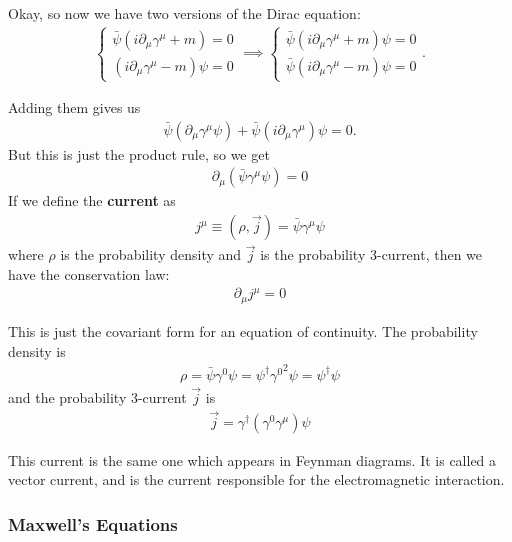 \documentclass{book}
\theoremstyle{definition}
\newcommand{\p}{\partial}
\begin{document}
Okay, so now we have two versions of the Dirac equation:
\begin{align}
\begin{cases}
\bar{\psi}(i\p_\mu \gamma^\mu + m) = 0 \\
(i\p_\mu \gamma^\mu - m)\psi = 0 
\end{cases}
\implies
\begin{cases}
\bar{\psi}(i\p_\mu \gamma^\mu + m)\psi = 0 \\
\bar{\psi}(i\p_\mu \gamma^\mu - m)\psi = 0 
\end{cases}.
\end{align}

Adding them gives us
\begin{align}
\bar{\psi}(\p_\mu \gamma^\mu \psi) + \bar{\psi}(i\p_\mu \gamma^\mu)\psi = 0.
\end{align}
But this is just the product rule, so we get
\begin{align}
\boxed{\p_\mu (\bar{\psi} \gamma^\mu \psi ) = 0}
\end{align}
If we define the \textbf{current} as
\begin{align}
j^\mu \equiv (\rho, \vec{j}) = \bar{\psi} \gamma^\mu \psi 
\end{align}
where $\rho$ is the probability density and $\vec{j}$ is the probability 3-current, then we have the conservation law:
\begin{align}
\boxed{\p_\mu j^\mu = 0}
\end{align}

 
This is just the covariant form for an equation of continuity. The probability density is 
\begin{align}
\boxed{\rho = \bar{\psi}\gamma^0\psi = \psi^\dagger {\gamma^0}^2 \psi = \psi^\dagger\psi}
\end{align}
and the probability 3-current $\vec{j}$ is 
\begin{align}
\boxed{\vec{j} = \gamma^\dagger (\gamma^0\gamma^\mu)\psi}
\end{align}


This current is the same one which appears in Feynman diagrams. It is called a vector current, and is the current responsible for the electromagnetic interaction. 






\subsubsection{Maxwell's Equations}
\end{document}

